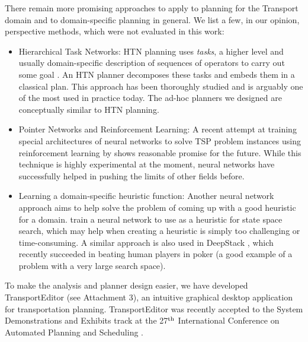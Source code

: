 There remain more promising approaches to apply to planning
for the Transport domain
and to domain-specific planning in general.
We list a few, in our opinion, perspective methods, which were not
evaluated in this work:
\begin{itemize}
\item Hierarchical Task Networks: 
HTN planning uses \textit{tasks},
a higher level and usually domain-specific description of sequences of operators
to carry out some goal \citep[Chapter~11]{Ghallab2004}.
An HTN planner decomposes these tasks and embeds them in a classical plan. This approach has been thoroughly studied and is arguably one of the most used in practice today. The ad-hoc planners we designed are conceptually similar to HTN planning.

\item Pointer Networks and Reinforcement Learning: 
A recent attempt at training special architectures of neural networks to solve TSP problem instances using reinforcement learning by \citet{Bello2016} shows
reasonable promise for the future. While this technique is highly experimental at the moment,
neural networks have successfully helped in pushing the limits of other fields before.

\item Learning a domain-specific heuristic function: Another neural network
approach aims to help solve the problem of coming up with a good heuristic for a domain. \citet{Chen2011}
train a neural network to use as a heuristic for state space search,
which may help when creating a heuristic is simply too challenging or time-consuming.
A similar approach is also used in DeepStack \citep{Moravcik2017}, which recently succeeded in
beating human players in poker (a good example of a problem with a very large search space).
\end{itemize}

To make the analysis and planner design easier, we have developed TransportEditor (see Attachment 3),
an intuitive graphical desktop application for transportation planning.
TransportEditor was recently accepted to the System Demonstrations and Exhibits
track at the 27$^{\textrm{th}}$ International Conference on Automated Planning and Scheduling \citep{Skopek2017}. 